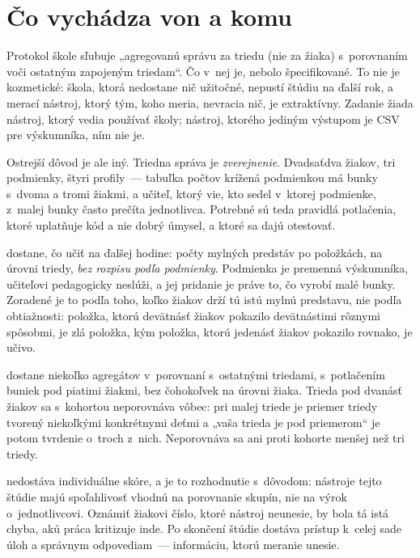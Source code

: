 \section{Čo vychádza von a komu}
\label{sec:spatna-vazba}

Protokol škole sľubuje „agregovanú správu za triedu (nie za žiaka) s~porovnaním
voči ostatným zapojeným triedam“. Čo v~nej je, nebolo špecifikované. To nie je
kozmetické: škola, ktorá nedostane nič užitočné, nepustí štúdiu na ďalší rok, a
merací nástroj, ktorý tým, koho meria, nevracia nič, je extraktívny. Zadanie žiada
nástroj, ktorý vedia používať školy; nástroj, ktorého jediným výstupom je CSV pre
výskumníka, ním nie je.

Ostrejší dôvod je ale iný. Triedna správa je \emph{zverejnenie}. Dvadsaťdva
žiakov, tri podmienky, štyri profily~--- tabuľka počtov krížená podmienkou má
bunky s~dvoma a tromi žiakmi, a učiteľ, ktorý vie, kto sedel v~ktorej podmienke,
z~malej bunky často prečíta jednotlivca. Potrebné sú teda pravidlá potlačenia,
ktoré uplatňuje kód a nie dobrý úmysel, a ktoré sa dajú otestovať.

\begin{description}[leftmargin=0.6cm, nosep]
    \item[\textbf{Učiteľ}] dostane, čo učiť na ďalšej hodine: počty mylných
          predstáv po položkách, na úrovni triedy, \emph{bez rozpisu podľa
          podmienky}. Podmienka je premenná výskumníka, učiteľovi pedagogicky
          neslúži, a jej pridanie je práve to, čo vyrobí malé bunky. Zoradené je
          to podľa toho, koľko žiakov drží tú istú mylnú predstavu, nie podľa
          obtiažnosti: položka, ktorú devätnásť žiakov pokazilo devätnástimi
          rôznymi spôsobmi, je zlá položka, kým položka, ktorú jedenásť žiakov
          pokazilo rovnako, je učivo.
    \item[\textbf{Škola}] dostane niekoľko agregátov v~porovnaní s~ostatnými
          triedami, s~potlačením buniek pod piatimi žiakmi, bez čohokoľvek na
          úrovni žiaka. Trieda pod dvanásť žiakov sa s~kohortou neporovnáva vôbec:
          pri malej triede je priemer triedy tvorený niekoľkými konkrétnymi deťmi
          a „vaša trieda je pod priemerom“ je potom tvrdenie o~troch z~nich.
          Neporovnáva sa ani proti kohorte menšej než tri triedy.
    \item[\textbf{Žiak}] nedostáva individuálne skóre, a je to rozhodnutie
          s~dôvodom: nástroje tejto štúdie majú spoľahlivosť vhodnú na porovnanie
          skupín, nie na výrok o~jednotlivcovi. Oznámiť žiakovi číslo, ktoré
          nástroj neunesie, by bola tá istá chyba, akú práca kritizuje inde.
          Po skončení štúdie dostáva prístup k~celej sade úloh a správnym
          odpovediam~--- informáciu, ktorú meranie unesie.
\end{description}


